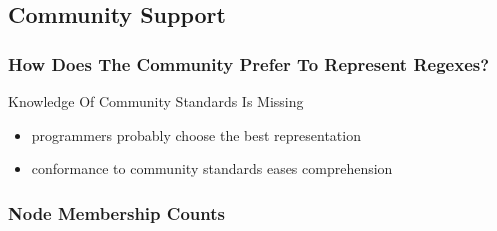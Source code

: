 \subsection{Community Support}

{
\begin{frame}
\frametitle{How Does The Community Prefer To Represent Regexes?}
\begin{block}{\begin{Large}Knowledge Of Community Standards Is Missing\end{Large}}
\begin{itemize}
\item \begin{large}programmers probably choose the best representation\end{large}
\item \begin{large}conformance to community standards eases comprehension\cite{comm}\end{large}
\end{itemize}
\end{block}
\end{frame}
}



\begin{frame}
\frametitle{Node Membership Counts}

\end{frame}

